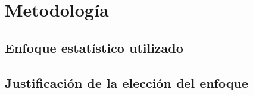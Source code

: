 \section{Metodología}

	\subsection{Enfoque estatístico utilizado} 
	
	\subsection{Justificación de la elección del enfoque} 
	